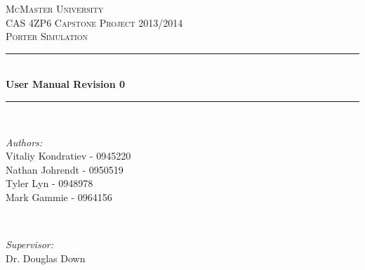 \documentclass[paper=letter, fontsize=10pt]{scrartcl}
\numberwithin{equation}{section}		%
\numberwithin{figure}{section}			%
\numberwithin{table}{section}				%
\begin{document}
\begin{titlepage}

\newcommand{\HRule}{\rule{\linewidth}{0.5mm}} %

\begin{center}
 

\textsc{\LARGE McMaster University}\\[1.5cm] %
\textsc{\Large CAS 4ZP6 Capstone Project 2013/2014}\\[0.5cm] %
\textsc{\large Porter Simulation}\\[0.5cm] %


\HRule \\[0.4cm]
{ \huge \bfseries User Manual Revision 0}\\[0.4cm] %
\HRule \\[1.5cm]
 

\begin{minipage}{0.4\textwidth}
\begin{flushleft} \large
\emph{Authors:}\\
Vitaliy Kondratiev - 0945220\\
Nathan Johrendt - 0950519\\
Tyler Lyn - 0948978\\
Mark Gammie - 0964156
\end{flushleft}
\end{minipage}
~
\begin{minipage}{0.4\textwidth}
\begin{flushright} \large
\emph{Supervisor:} \\
Dr. Douglas Down %
\end{flushright}
\end{minipage}\\[4cm]


\end{center}
\end{titlepage}
\end{document}
